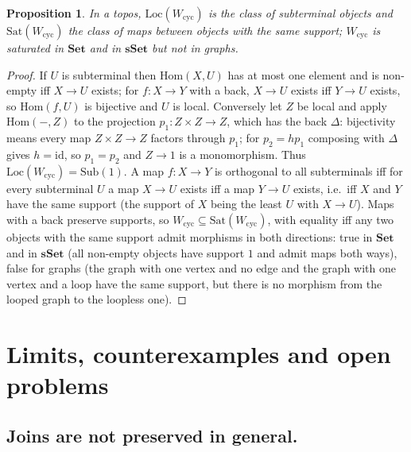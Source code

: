 \documentclass[11pt]{amsart}
\newtheorem{prop}[thm]{Proposition}
\theoremstyle{definition}
\newcommand{\Sat}{\mathrm{Sat}}
\newcommand{\Loc}{\mathrm{Loc}}
\newcommand{\Hom}{\mathrm{Hom}}
\newcommand{\Wcyc}{W_{\mathrm{cyc}}}
\newcommand{\sset}{\mathbf{sSet}}
\begin{document}
\begin{prop}\label{prop:toposcyc}
In a topos, $\Loc(\Wcyc)$ is the class of subterminal objects and
$\Sat(\Wcyc)$ the class of maps between objects with the same support; $\Wcyc$ is
saturated in $\mathbf{Set}$ and in $\sset$ but not in graphs.
\end{prop}
\begin{proof}
If $U$ is subterminal then $\Hom(X,U)$ has at most one element and is non-empty
iff $X\to U$ exists; for $f\colon X\to Y$ with a back, $X\to U$ exists iff
$Y\to U$ exists, so $\Hom(f,U)$ is bijective and $U$ is local. Conversely let
$Z$ be local and apply $\Hom(-,Z)$ to the projection $p_1\colon Z\times Z\to Z$,
which has the back $\Delta$: bijectivity means every map $Z\times Z\to Z$
factors through $p_1$; for $p_2=hp_1$ composing with $\Delta$ gives $h=\mathrm{id}$,
so $p_1=p_2$ and $Z\to1$ is a monomorphism. Thus $\Loc(\Wcyc)=\mathrm{Sub}(1)$.
A map $f\colon X\to Y$ is orthogonal to all subterminals iff for every
subterminal $U$ a map $X\to U$ exists iff a map $Y\to U$ exists, i.e.\ iff
$X$ and $Y$ have the same support (the support of $X$ being the least $U$ with
$X\to U$). Maps with a back preserve supports, so $\Wcyc\subseteq\Sat(\Wcyc)$,
with equality iff any two objects with the same support admit morphisms in
both directions: true in $\mathbf{Set}$ and in $\sset$ (all non-empty objects
have support $1$ and admit maps both ways), false for graphs (the graph with
one vertex and no edge and the graph with one vertex and a loop have the same
support, but there is no morphism from the looped graph to the loopless one).
\end{proof}

\section{Limits, counterexamples and open problems}\label{sec:limits}

\subsection{Joins are not preserved in general.}
\end{document}
